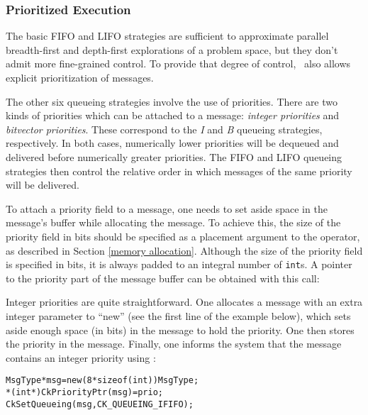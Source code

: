\subsubsection{Prioritized Execution}
\label{prioritized message passing}

The basic FIFO and LIFO strategies are sufficient to approximate
parallel breadth-first and depth-first explorations of a problem
space, but they don't admit more fine-grained control. To provide that
degree of control, \charmpp\ also allows explicit prioritization of
messages.

The other six queueing strategies involve the use of
priorities.  There are two kinds of priorities which
can be attached to a message: {\sl integer priorities} and {\sl bitvector priorities}. These correspond to the {\em I} and {\em B} queueing
strategies, respectively. In both cases, numerically lower priorities
will be dequeued and delivered before numerically greater
priorities. The FIFO and LIFO queueing strategies then control the
relative order in which messages of the same priority will be
delivered.

To attach a priority field to a
message, one needs to set aside space in the message's buffer while
allocating the message.  To achieve this, the
size of the priority field in bits should be
specified as a placement argument to the  operator, as
described in Section \ref{memory allocation}.  Although the size of
the priority field is specified in bits, it is always padded to an
integral number of {\tt int}s.  A pointer to the priority part of the
message buffer can be obtained with this call:


Integer priorities are quite straightforward.  One allocates a message
with an extra integer parameter to ``new'' (see the first line of the
example below), which sets aside enough space (in bits) in the message
to hold the priority.  One then stores the priority in the message.
Finally, one informs the system that the message contains an integer
priority using :

\begin{alltt}
  MsgType *msg = new (8*sizeof(int)) MsgType;
  *(int*)CkPriorityPtr(msg) = prio;
  CkSetQueueing(msg, CK_QUEUEING_IFIFO);
\end{alltt}


